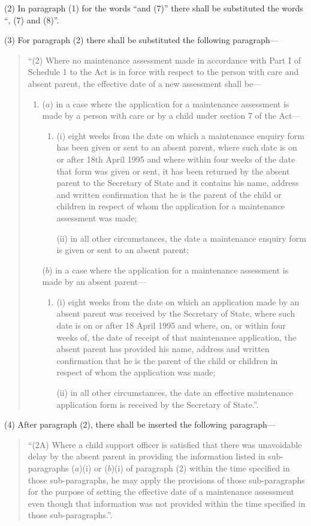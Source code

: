 \documentclass[12pt,a4paper]{article}
\begin{document}
(2) In paragraph (1) for the words “and (7)” there shall be substituted the words “, (7) and (8)”.

(3) For paragraph (2) there shall be substituted the following paragraph—
\begin{quotation}
“(2) Where no maintenance assessment made in accordance with Part I of Schedule 1 to the Act is in force with respect to the person with care and absent parent, the effective date of a new assessment shall be—
\begin{enumerate}\item[]
($a$) in a case where the application for a maintenance assessment is made by a person with care or by a child under section 7 of the Act—
\begin{enumerate}\item[]
(i) eight weeks from the date on which a maintenance enquiry form has been given or sent to an absent parent, where such date is on or after 18th April 1995 and where within four weeks of the date that form was given or sent, it has been returned by the absent parent to the Secretary of State and it contains his name, address and written confirmation that he is the parent of the child or children in respect of whom the application for a maintenance assessment was made;

(ii) in all other circumstances, the date a maintenance enquiry form is given or sent to an absent parent;
\end{enumerate}

($b$) in a case where the application for a maintenance assessment is made by an absent parent—
\begin{enumerate}\item[]
(i) eight weeks from the date on which an application made by an absent parent was received by the Secretary of State, where such date is on or after 18 April 1995 and where, on, or within four weeks of, the date of receipt of that maintenance application, the absent parent has provided his name, address and written confirmation that he is the parent of the child or children in respect of whom the application was made;

(ii) in all other circumstances, the date an effective maintenance application form is received by the Secretary of State.”.
\end{enumerate}
\end{enumerate}
\end{quotation}

(4) After paragraph (2), there shall be inserted the following paragraph—
\begin{quotation}
“(2A) Where a child support officer is satisfied that there was unavoidable delay by the absent parent in providing the information listed in sub-paragraphs ($a$)(i) or ($b$)(i) of paragraph (2) within the time specified in those sub-paragraphs, he may apply the provisions of those sub-paragraphs for the purpose of setting the effective date of a maintenance assessment even though that information was not provided within the time specified in those sub-paragraphs.”.
\end{quotation}
\end{document}

